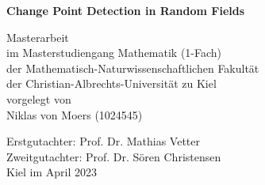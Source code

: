 

\begin{titlepage}
        \begin{center}
        \vspace*{1.0cm}

        \Huge
        {\bf Change Point Detection in Random Fields }

        \vspace*{1.0cm}

        \normalsize
        Masterarbeit\\
        im Masterstudiengang Mathematik (1-Fach) \\
        der Mathematisch-Naturwissenschaftlichen Fakultät \\
        der Christian-Albrechts-Universität zu Kiel \\
        vorgelegt von \\
        \vspace*{1.0cm}
        Niklas von Moers (1024545)
        \end{center}
        \vspace*{1.0cm}
        Erstgutachter: Prof. Dr. Mathias Vetter \\
        Zweitgutachter: Prof. Dr. Sören Christensen \\
        Kiel im April 2023


\end{titlepage}


